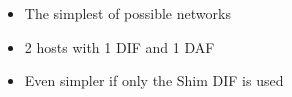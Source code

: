 \begin{itemize}
    \item The simplest of possible networks
    \item 2 hosts with 1 DIF and 1 DAF
    \item Even simpler if only the Shim DIF is used
\end{itemize}
